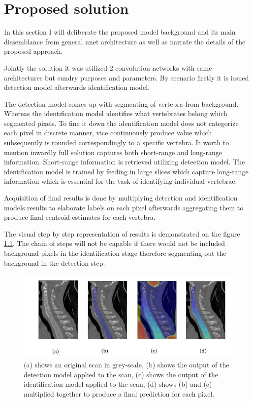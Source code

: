 \chapter{Proposed solution}
\label{ch:proposed_solution}
In this section I will deliberate the proposed model background and its main dissemblance from general unet architecture as well as narrate the details of the proposed approach. 

Jointly the solution it was utilized 2 convolution networks with same architectures but sundry purposes and parameters. By scenario firstly it is issued detection model afterwards identification model. 

The detection model comes up with segmenting of vertebra from background. Whereas the identification model identifies what vertebrates belong which segmented pixels. To fine it down the identification model does not categorize each pixel in discrete manner, vice continuously produce value which subsequently is rounded correspondingly to a specific vertebra. It worth to mention inwardly full solution captures both short-range and long-range information. Short-range information is retrieved utilizing detection model. The identification model is trained by feeding in large slices which capture long-range information which is essential for the task of identifying individual vertebrae. 

Acquisition of final results is done by multiplying detection and identification models results to elaborate labels on each pixel afterwards aggregating them to produce final centroid estimates for each vertebra.

The visual step by step representation of results is demonstrated on the figure \ref{fig:detection_identification_steps}. The chain of steps will not be capable if there would not be included background pixels in the identification stage therefore segmenting out the background in the detection step.

\begin{figure}[h]
    \centering \includegraphics[width=12cm]{images/detection_identification_steps.png}
    \caption {(a) shows an original scan in grey-scale, (b) shows the output of the detection model applied to the scan, (c) shows the output of the identification model applied to the scan, (d) shows (b) and (c) multiplied together to produce a final prediction for each pixel.}
    \label{fig:detection_identification_steps}
\end{figure}


